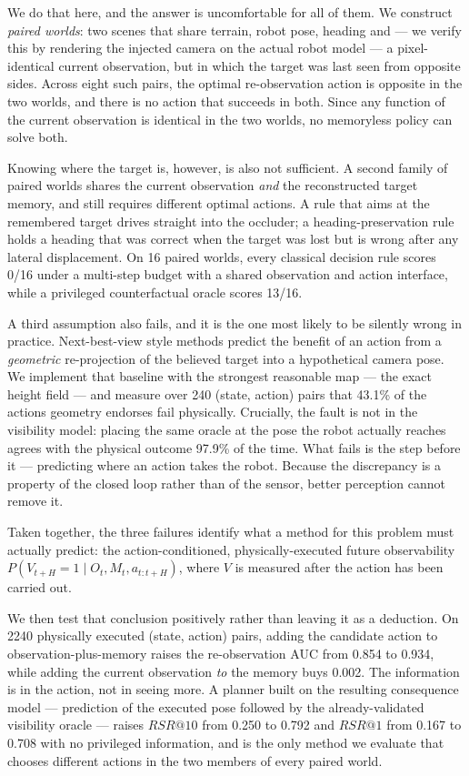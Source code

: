 \documentclass[utf8]{FrontiersinHarvard}
\begin{document}
We do that here, and the answer is uncomfortable for all of them. We construct
\emph{paired worlds}: two scenes that share terrain, robot pose, heading and --- we
verify this by rendering the injected camera on the actual robot model --- a
pixel-identical current observation, but in which the target was last seen from opposite
sides. Across eight such pairs, the optimal re-observation action is opposite in the two
worlds, and there is no action that succeeds in both. Since any function of the current
observation is identical in the two worlds, no memoryless policy can solve both.

Knowing where the target is, however, is also not sufficient. A second family of paired
worlds shares the current observation \emph{and} the reconstructed target memory, and
still requires different optimal actions. A rule that aims at the remembered target
drives straight into the occluder; a heading-preservation rule holds a heading that was
correct when the target was lost but is wrong after any lateral displacement. On 16
paired worlds, every classical decision rule scores 0/16 under a multi-step budget with
a shared observation and action interface, while a privileged counterfactual oracle
scores 13/16.

A third assumption also fails, and it is the one most likely to be silently wrong in
practice. Next-best-view style methods predict the benefit of an action from a
\emph{geometric} re-projection of the believed target into a hypothetical camera pose.
We implement that baseline with the strongest reasonable map --- the exact height field
--- and measure over 240 (state, action) pairs that 43.1\% of the actions geometry
endorses fail physically. Crucially, the fault is not in the visibility model: placing
the same oracle at the pose the robot actually reaches agrees with the physical outcome
97.9\% of the time. What fails is the step before it --- predicting where an action
takes the robot. Because the discrepancy is a property of the closed loop rather than of
the sensor, better perception cannot remove it.

Taken together, the three failures identify what a method for this problem must
actually predict: the action-conditioned, physically-executed future observability
$P(V_{t+H}=1 \mid O_t, M_t, a_{t:t+H})$, where $V$ is measured after the action has
been carried out.

We then test that conclusion positively rather than leaving it as a deduction. On 2240
physically executed (state, action) pairs, adding the candidate action to
observation-plus-memory raises the re-observation AUC from 0.854 to 0.934, while adding
the current observation \emph{to} the memory buys 0.002. The information is in the
action, not in seeing more. A planner built on the resulting consequence model ---
prediction of the executed pose followed by the already-validated visibility oracle ---
raises $RSR@10$ from 0.250 to 0.792 and $RSR@1$ from 0.167 to 0.708 with no privileged
information, and is the only method we evaluate that chooses different actions in the
two members of every paired world.
\end{document}
